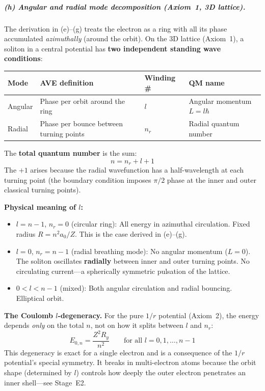 \subparagraph{(h) Angular and radial mode decomposition
(Axiom~1, 3D lattice).}

The derivation in (e)--(g) treats the electron as
a ring with all its phase accumulated \emph{azimuthally}
(around the orbit).  On the 3D lattice (Axiom~1),
a soliton in a central potential has \textbf{two
independent standing wave conditions}:

\begin{center}
\small
\renewcommand{\arraystretch}{1.2}
\begin{tabular}{llll}
\hline
\textbf{Mode} & \textbf{AVE definition} &
\textbf{Winding \#} & \textbf{QM name} \\
\hline
Angular & Phase per orbit around the ring &
$l$ & Angular momentum $L = l\hbar$ \\
Radial & Phase per bounce between turning points &
$n_r$ & Radial quantum number \\
\hline
\end{tabular}
\end{center}
The \textbf{total quantum number} is the sum:
\begin{equation}
    \boxed{n = n_r + l + 1}
    \label{eq:n_decomposition}
\end{equation}
The $+1$ arises because the radial wavefunction
has a half-wavelength at each turning point
(the boundary condition imposes $\pi/2$ phase
at the inner and outer classical turning points).

\noindent\textbf{Physical meaning of $l$:}
\begin{itemize}
    \item $l = n - 1$, $n_r = 0$ (circular ring):
          All energy in azimuthal circulation.
          Fixed radius $R = n^2 a_0 / Z$.
          This is the case derived in (e)--(g).
    \item $l = 0$, $n_r = n - 1$ (radial breathing mode):
          No angular momentum ($L = 0$).
          The soliton oscillates \textbf{radially}
          between inner and outer turning points.
          No circulating current---a spherically
          symmetric pulsation of the lattice.
    \item $0 < l < n-1$ (mixed):
          Both angular circulation and radial
          bouncing.  Elliptical orbit.
\end{itemize}

\noindent\textbf{The Coulomb $l$-degeneracy.}
For the pure $1/r$ potential (Axiom~2), the energy
depends \emph{only} on the total $n$, not on how it
splits between $l$ and $n_r$:
\begin{equation}
    E_{0,n} = \frac{Z^2 R_y}{n^2}
    \qquad\text{for all $l = 0, 1, \ldots, n{-}1$}
    \label{eq:l_degeneracy}
\end{equation}
This degeneracy is exact for a single electron
and is a consequence of the $1/r$ potential's
special symmetry.  It breaks in multi-electron
atoms because the orbit shape (determined by $l$)
controls how deeply the outer electron
penetrates an inner shell---see Stage~E2.

